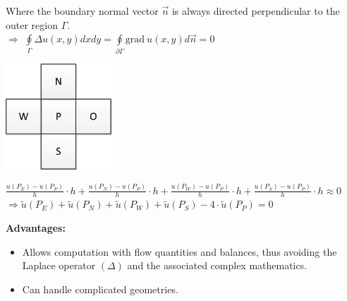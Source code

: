 Where the boundary normal vector $\vec{n}$ is always directed perpendicular to the outer region $\Gamma$.\\

$\Rightarrow$ $\oint\limits_{\Gamma}{\Delta u(x,y) dx dy}=\oint\limits_{\partial\Gamma}{\mathrm{grad}~ u(x,y) d\vec{n}}=0$

\begin{minipage}{4cm}
	\includegraphics[width=4cm]{Content/02_numerics/FVMPrinzip.png}
\end{minipage}
\hfill
\begin{minipage}{14cm}
	$\frac{u(P_E)-u(P_P)}{h}\cdot h+\frac{u(P_N)-u(P_P)}{h}\cdot h+\frac{u(P_W)-u(P_P)}{h}\cdot h+\frac{u(P_S)-u(P_P)}{h}\cdot h\approx 0$\\

	$\Rightarrow\tilde{u}(P_E)+\tilde{u}(P_N)+\tilde{u}(P_W)+\tilde{u}(P_S)-4\cdot\tilde{u}(P_P)=0$
\end{minipage}

\textbf{Advantages:}\\
\begin{itemize}
\item Allows computation with flow quantities and balances, thus avoiding the Laplace operator $(\Delta)$ and the associated complex mathematics.
\item Can handle complicated geometries.
\end{itemize}

